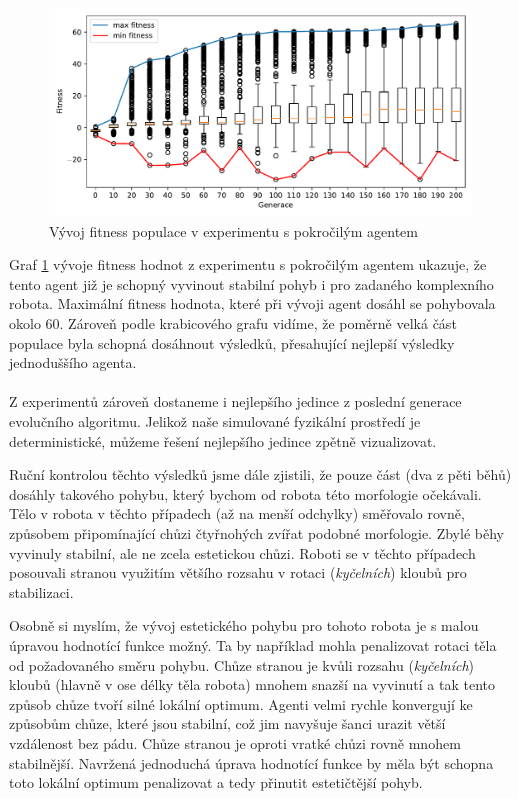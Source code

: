 \begin{figure}[!h]
    \centering
    \includegraphics[width=1\textwidth]{../img/experiment1_TFS_10ticks.pdf}
    \caption{Vývoj fitness populace v experimentu s pokročilým agentem}
    \label{exp:first_TFS}
\end{figure}

Graf \ref{exp:first_TFS} vývoje fitness hodnot z experimentu s pokročilým
agentem ukazuje, že tento agent již je schopný vyvinout stabilní pohyb i pro
zadaného komplexního robota. Maximální fitness hodnota, které při vývoji agent
dosáhl se pohybovala okolo 60. Zároveň podle krabicového grafu vidíme, že
poměrně velká část populace byla schopná dosáhnout výsledků, přesahující
nejlepší výsledky jednoduššího agenta.

\paragraph{}
Z experimentů zároveň dostaneme i nejlepšího jedince z poslední generace
evolučního algoritmu. Jelikož naše simulované fyzikální prostředí je
deterministické, můžeme řešení nejlepšího jedince zpětně vizualizovat.

Ruční kontrolou těchto výsledků jsme dále zjistili, že pouze část (dva z pěti
běhů) dosáhly takového pohybu, který bychom od robota této morfologie
očekávali. Tělo v robota v těchto případech (až na menší odchylky) směřovalo
rovně, způsobem připomínající chůzi čtyřnohých zvířat podobné morfologie. Zbylé
běhy vyvinuly stabilní, ale ne zcela estetickou chůzi. Roboti se v těchto
případech posouvali stranou využitím většího rozsahu v rotaci
(\emph{kyčelních}) kloubů pro stabilizaci.

Osobně si myslím, že vývoj estetického pohybu pro tohoto robota je s malou
úpravou hodnotící funkce možný. Ta by například mohla penalizovat rotaci těla
od požadovaného směru pohybu. Chůze stranou je kvůli rozsahu (\emph{kyčelních})
kloubů (hlavně v ose délky těla robota) mnohem snazší na vyvinutí a tak tento
způsob chůze tvoří silné lokální optimum. Agenti velmi rychle konvergují ke
způsobům chůze, které jsou stabilní, což jim navyšuje šanci urazit větší
vzdálenost bez pádu. Chůze stranou je oproti vratké chůzi rovně mnohem
stabilnější. Navržená jednoduchá úprava hodnotící funkce by měla být schopna
toto lokální optimum penalizovat a tedy přinutit estetičtější pohyb.

